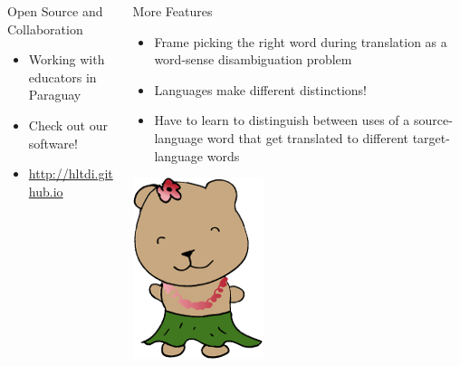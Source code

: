 \documentclass[final]{beamer}
\begin{document}
\begin{frame}{}
\begin{columns}[t]
\begin{column}{.32\linewidth}
  \begin{block}{\large Open Source and Collaboration}
    \centering
    \begin{itemize}
    \item Working with educators in Paraguay
    \item Check out our software!
    \item \url{http://hltdi.github.io}
    \end{itemize}
  \end{block}


  \end{column}

  \begin{column}{.32\linewidth}
  \vfill
  \begin{block}{\large More Features}
    \begin{itemize}
    \item Frame picking the right word during translation as a word-sense disambiguation problem
    \item Languages make different distinctions!
    \item Have to learn to distinguish between uses of a source-language word
    that get translated to different target-language words
    \end{itemize}
  \end{block}

  \hfill
  \begin{center}
  \includegraphics[width=.30\linewidth]{hltdi-logo-small.png}
  \end{center}

  \end{column}
\end{columns}
\end{frame}
\end{document}
